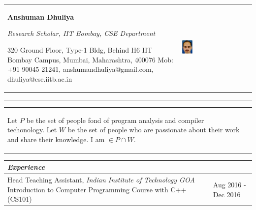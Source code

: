 \documentclass[a4paper,12pt]{article}
\newcommand{\Heading}[1]{\textbf{\itshape\normalsize #1}}
\begin{document}
\begin{flushleft}



    \begin{tabular*}{\textwidth}{m{} m{} }
        {\LARGE{}\rule[3ex]{0ex}{0ex}\textbf{Anshuman Dhuliya}}\newline%
        {\rule[3ex]{0ex}{0ex}\large{}\itshape{}Research Scholar, IIT Bombay, CSE Department} \newline%
        \rule[3ex]{0ex}{0ex}{320 Ground Floor, Type-1 Bldg, Behind H6\newline%
IIT Bombay Campus, Mumbai, Maharashtra, 400076\newline%
        Mob: +91 90045 21241, anshumandhuliya@gmail.com, dhuliya@cse.iitb.ac.in}

&  \includegraphics[natwidth=273,natheight=360,width=0.15\textwidth]{images/anshuman1.eps} \\
\end{tabular*}
\rule[1pt]{\textwidth}{2pt}
\begin{tabular*}{\textwidth}{m{} m{} }
{\itshape{}\rule[3ex]{0ex}{0ex}Let $P$ be the set of people fond
  of program analysis and compiler techonology.
  Let $W$ be the set of people who are passionate about their work
  and share their knowledge.
  I am $\in P \cap W$.\newline%
    } & \\
\end{tabular*}

    \vspace{3mm}
\begin{tabular}{ m{}| R{0.25\textwidth}}
\multicolumn{2}{l}{\Heading{Experience}} \\
    \hline
    \hline
    \rule[3ex]{0ex}{0ex}Head Teaching Assistant, \textit{Indian Institute of Technology GOA} \newline{}Introduction to Computer Programming Course with C++ (CS101) & Aug 2016 - Dec 2016\\ \hline


\end{tabular}
\end{flushleft}
\end{document}

